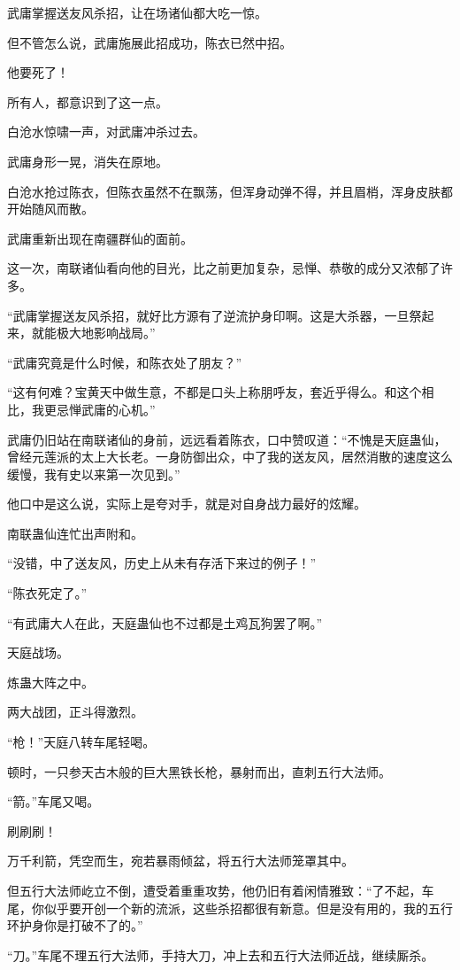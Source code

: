 \begin{this_body}
武庸掌握送友风杀招，让在场诸仙都大吃一惊。

但不管怎么说，武庸施展此招成功，陈衣已然中招。

他要死了！

所有人，都意识到了这一点。

白沧水惊啸一声，对武庸冲杀过去。

武庸身形一晃，消失在原地。

白沧水抢过陈衣，但陈衣虽然不在飘荡，但浑身动弹不得，并且眉梢，浑身皮肤都开始随风而散。

武庸重新出现在南疆群仙的面前。

这一次，南联诸仙看向他的目光，比之前更加复杂，忌惮、恭敬的成分又浓郁了许多。

“武庸掌握送友风杀招，就好比方源有了逆流护身印啊。这是大杀器，一旦祭起来，就能极大地影响战局。”

“武庸究竟是什么时候，和陈衣处了朋友？”

“这有何难？宝黄天中做生意，不都是口头上称朋呼友，套近乎得么。和这个相比，我更忌惮武庸的心机。”

武庸仍旧站在南联诸仙的身前，远远看着陈衣，口中赞叹道：“不愧是天庭蛊仙，曾经元莲派的太上大长老。一身防御出众，中了我的送友风，居然消散的速度这么缓慢，我有史以来第一次见到。”

他口中是这么说，实际上是夸对手，就是对自身战力最好的炫耀。

南联蛊仙连忙出声附和。

“没错，中了送友风，历史上从未有存活下来过的例子！”

“陈衣死定了。”

“有武庸大人在此，天庭蛊仙也不过都是土鸡瓦狗罢了啊。”

天庭战场。

炼蛊大阵之中。

两大战团，正斗得激烈。

“枪！”天庭八转车尾轻喝。

顿时，一只参天古木般的巨大黑铁长枪，暴射而出，直刺五行大法师。

“箭。”车尾又喝。

刷刷刷！

万千利箭，凭空而生，宛若暴雨倾盆，将五行大法师笼罩其中。

但五行大法师屹立不倒，遭受着重重攻势，他仍旧有着闲情雅致：“了不起，车尾，你似乎要开创一个新的流派，这些杀招都很有新意。但是没有用的，我的五行环护身你是打破不了的。”

“刀。”车尾不理五行大法师，手持大刀，冲上去和五行大法师近战，继续厮杀。


\end{this_body}
